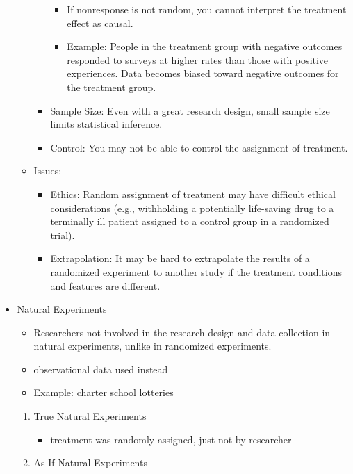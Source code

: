 \documentclass[]{book}
\providecommand{\tightlist}{%
  \setlength{\itemsep}{0pt}\setlength{\parskip}{0pt}}
\begin{document}
\begin{itemize}
\begin{itemize}
\begin{itemize}
      \begin{itemize}
      \tightlist
      \item
        If nonresponse is not random, you cannot interpret the treatment effect as causal.
      \item
        Example: People in the treatment group with negative outcomes responded to surveys at higher rates than those with positive experiences. Data becomes biased toward negative outcomes for the treatment group.
      \end{itemize}
    \item
      Sample Size: Even with a great research design, small sample size limits statistical inference.
    \item
      Control: You may not be able to control the assignment of treatment.
    \end{itemize}
  \item
    Issues:

    \begin{itemize}
    \tightlist
    \item
      Ethics: Random assignment of treatment may have difficult ethical considerations (e.g., withholding a potentially life-saving drug to a terminally ill patient assigned to a control group in a randomized trial).
    \item
      Extrapolation: It may be hard to extrapolate the results of a randomized experiment to another study if the treatment conditions and features are different.
    \end{itemize}
  \end{itemize}
\item
  Natural Experiments

  \begin{itemize}
  \tightlist
  \item
    Researchers not involved in the research design and data collection in natural experiments, unlike in randomized experiments.
  \item
    observational data used instead
  \item
    Example: charter school lotteries
  \end{itemize}

  \begin{enumerate}
  \def\labelenumi{\arabic{enumi}.}
  \tightlist
  \item
    True Natural Experiments

    \begin{itemize}
    \tightlist
    \item
      treatment was randomly assigned, just not by researcher
    \end{itemize}
  \item
    As-If Natural Experiments


\end{enumerate}
\end{itemize}
\end{document}
